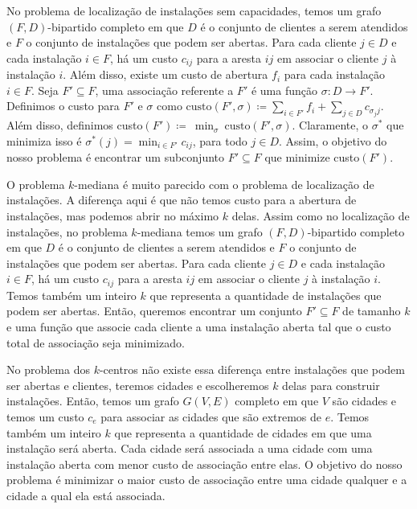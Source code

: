 \documentclass[12pt]{article}
\begin{document}
No problema de localização de instalações sem capacidades, temos um grafo $(F,D)$-bipartido completo em que $D$ é o conjunto de clientes a serem atendidos e $F$ o conjunto de instalações que podem ser abertas. Para cada cliente $j \in D$ e cada instalação $i \in F$, há um custo $c_{ij}$ para a aresta $ij$ em associar o cliente $j$ à instalação $i$. Além disso, existe um custo de abertura $f_i$ para cada instalação $i \in F$. Seja $F' \subseteq F$, uma associação referente a $F'$ é uma função $\sigma : D \to F'$. Definimos o custo para $F'$ e $\sigma$ como $\text{custo}(F',\sigma)\coloneqq \sum_{ i \in F'} f_i + \sum_{j \in D} c_{\sigma_{j}j}$. Além disso, definimos custo$(F') \coloneqq~\min_{\sigma}~\text{custo}(F',\sigma)$. Claramente, o $\sigma^*$ que minimiza isso é $\sigma^*(j) = \min_{i \in F'} c_{ij}$, para todo $j \in D$. Assim, o objetivo do nosso problema é encontrar um subconjunto $F' \subseteq F$ que minimize custo$(F')$.


O problema $k$-mediana é muito parecido com o problema de localização de instalações. A diferença aqui é que não temos custo para a abertura de instalações, mas podemos abrir no máximo $k$ delas. 
Assim como no localização de instalações, no problema $k$-mediana temos um grafo $(F,D)$-bipartido completo em que $D$ é o conjunto de clientes a serem atendidos e $F$ o conjunto de instalações que podem ser abertas. Para cada cliente $j \in D$ e cada instalação $i \in F$, há um custo $c_{ij}$ para a aresta $ij$ em associar o cliente $j$ à instalação $i$. Temos também um inteiro $k$ que representa a quantidade de instalações que podem ser abertas. Então, queremos encontrar um conjunto $F' \subseteq F$ de tamanho $k$ e uma função que associe cada cliente a uma instalação aberta tal que o custo total de associação seja minimizado.

No problema dos $k$-centros não existe essa diferença entre instalações que podem ser abertas e clientes, teremos cidades e escolheremos $k$ delas para construir instalações.
Então, temos um grafo $G(V,E)$ completo em que $V$ são cidades e temos um custo $c_{e}$ para associar as cidades que são extremos de $e$. Temos também um inteiro $k$ que representa a quantidade de cidades em que uma instalação será aberta. Cada cidade será associada a uma cidade com uma instalação aberta com menor custo de associação entre elas. O objetivo do nosso problema é minimizar o maior custo de associação entre uma cidade qualquer e a cidade a qual ela está associada.
\end{document}
